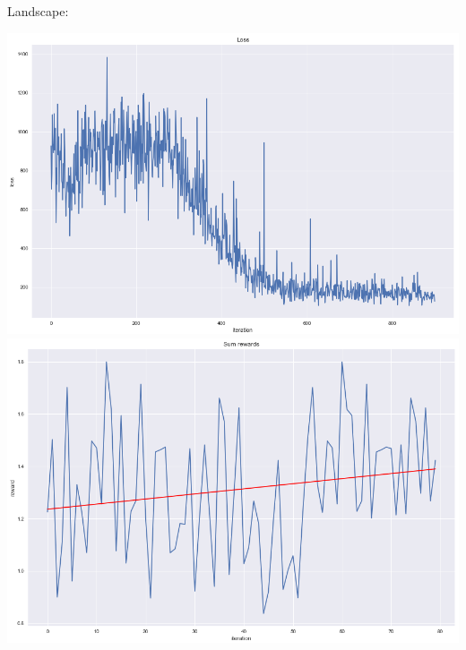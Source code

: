 \documentclass[t]{beamer}
\begin{document}
\begin{frame}
	\frametitle{\insertsection}
	Landscape:

	\includegraphics[height=0.43\textheight]{images/landscape_loss.png}
	\includegraphics[height=0.43\textheight]{images/landscape_rewards.png}
\end{frame}
\end{document}
